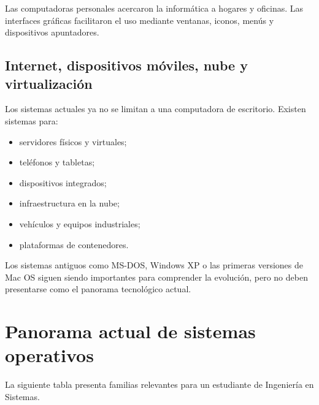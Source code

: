 \documentclass[
  spanish,
  letterpaper,
]{scrbook}
\providecommand{\tightlist}{%
  \setlength{\itemsep}{0pt}\setlength{\parskip}{0pt}}
\begin{document}
Las computadoras personales acercaron la informática a hogares y
oficinas. Las interfaces gráficas facilitaron el uso mediante ventanas,
iconos, menús y dispositivos apuntadores.

\section{Internet, dispositivos móviles, nube y
virtualización}\label{internet-dispositivos-muxf3viles-nube-y-virtualizaciuxf3n}

Los sistemas actuales ya no se limitan a una computadora de escritorio.
Existen sistemas para:

\begin{itemize}
\tightlist
\item
  servidores físicos y virtuales;
\item
  teléfonos y tabletas;
\item
  dispositivos integrados;
\item
  infraestructura en la nube;
\item
  vehículos y equipos industriales;
\item
  plataformas de contenedores.
\end{itemize}

\begin{tcolorbox}[enhanced jigsaw, arc=.35mm, bottomrule=.15mm, bottomtitle=1mm, breakable, colback=white, colbacktitle=quarto-callout-note-color!10!white, colframe=quarto-callout-note-color-frame, coltitle=black, left=2mm, leftrule=.75mm, opacityback=0, opacitybacktitle=0.6, rightrule=.15mm, title=\textcolor{quarto-callout-note-color}{\faInfo}\hspace{0.5em}{Perspectiva histórica}, titlerule=0mm, toprule=.15mm, toptitle=1mm]

Los sistemas antiguos como MS-DOS, Windows XP o las primeras versiones
de Mac OS siguen siendo importantes para comprender la evolución, pero
no deben presentarse como el panorama tecnológico actual.

\end{tcolorbox}


\chapter{Panorama actual de sistemas
operativos}\label{panorama-actual-de-sistemas-operativos}

La siguiente tabla presenta familias relevantes para un estudiante de
Ingeniería en Sistemas.
\end{document}
